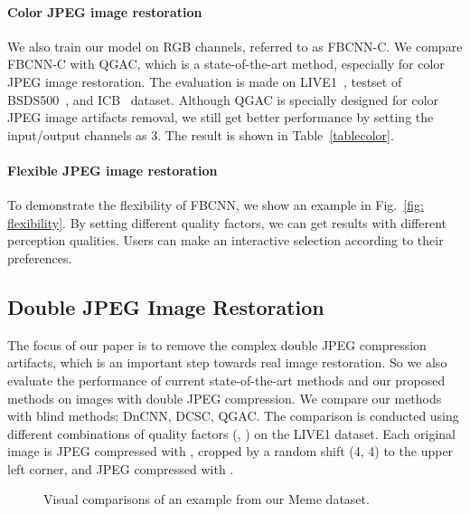 \documentclass[10pt,twocolumn,letterpaper]{article}
\begin{document}
\paragraph{Color JPEG image restoration} We also train our model on RGB channels, referred to as FBCNN-C. We compare FBCNN-C with QGAC, which is a state-of-the-art method, especially for color JPEG image restoration. The evaluation is made on LIVE1~\cite{sheikh2005live}, testset of BSDS500~\cite{martin2001database}, and ICB~\cite{icb} dataset. Although QGAC is specially designed for color JPEG image artifacts removal, we still get better performance by setting the input/output channels as 3. The result is shown in Table~\ref{tablecolor}.

\paragraph{Flexible JPEG image restoration} To demonstrate the flexibility of FBCNN, we show an example in Fig.~\ref{fig: flexibility}. By setting different quality factors, we can get results with different perception qualities. Users can make an interactive selection according to their preferences.


\subsection{Double JPEG Image Restoration}
The focus of our paper is to remove the complex double JPEG compression artifacts, which is an important step towards real image restoration. So we also evaluate the performance of current state-of-the-art methods and our proposed methods on images with double JPEG compression. We compare our methods with blind methods: DnCNN, DCSC, QGAC. The comparison is conducted using different combinations of quality factors (, ) on the LIVE1 dataset. Each original image is JPEG compressed with , cropped by a random shift (4, 4) to the upper left corner, and JPEG compressed with .

\begin{figure*}[!ht]
\centering
\hspace{0.1cm}
\caption{Visual comparisons of an example from our Meme dataset.}
\label{real_compare}
\end{figure*}
\end{document}
